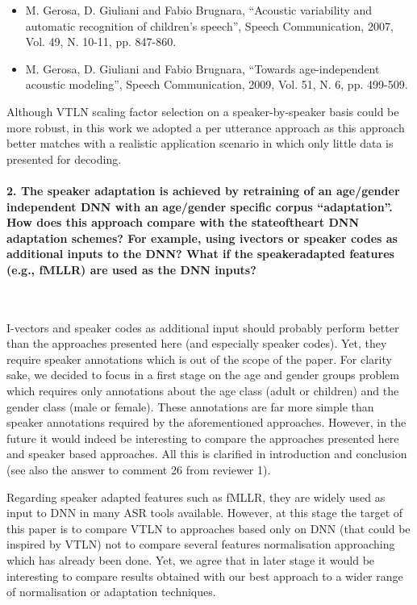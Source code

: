 \documentclass[]{article}
\begin{document}
\begin{itemize}
\item M. Gerosa, D. Giuliani  and Fabio Brugnara, ``Acoustic variability and
automatic recognition of children's speech'', Speech Communication,
2007, Vol. 49, N. 10-11, pp. 847-860.
\item M. Gerosa, D. Giuliani and Fabio Brugnara, ``Towards age-independent acoustic modeling'',
Speech Communication, 2009, Vol. 51, N. 6, pp. 499-509.
\end{itemize}

Although VTLN scaling factor selection on a speaker-by-speaker basis
could be more robust, in this work we adopted a per utterance approach
as this approach better matches with a realistic application scenario
in which only little data is presented for decoding.


\paragraph{2. The speaker adaptation is achieved by retraining of an age/gender independent DNN with an age/gender specific corpus “adaptation”. How does this approach compare with the stateoftheart DNN adaptation schemes? For example, using ivectors or speaker codes as additional inputs to the DNN? What if the speakeradapted features (e.g., fMLLR) are used as the DNN inputs?}

~

I-vectors and speaker codes as additional input should probably perform better than the approaches presented here (and especially speaker codes). Yet, they require speaker annotations which is out of the scope of the paper. For clarity sake, we decided to focus in a first stage on the age and gender groups problem which requires only annotations about the age class (adult or children) and the gender class (male or female). These annotations are far more simple than speaker annotations required by the aforementioned approaches. However, in the future it would indeed be interesting to compare the approaches presented here and speaker based approaches. All this is clarified in introduction and conclusion (see also the answer to comment 26 from reviewer 1).

Regarding speaker adapted features such as fMLLR, they are widely used as input to DNN in many ASR tools available. However, at this stage the target of this paper is to compare VTLN to approaches based only on DNN (that could be inspired by VTLN) not to compare several features normalisation approaching which has already been done. Yet, we agree that in later stage it would be interesting to compare results obtained with our best approach to a wider range of normalisation or adaptation techniques.
\end{document}

